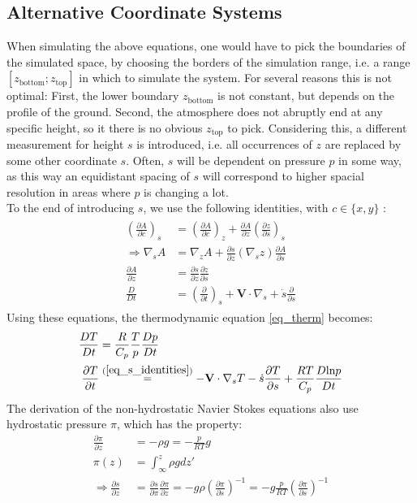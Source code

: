 \subsection{Alternative Coordinate Systems}
When simulating the above equations, one would have to pick the boundaries of the simulated space, by choosing the borders of the simulation range, i.e. a range $[z_{\text{bottom}};z_{\text{top}}]$ in which to simulate the system.
For several reasons this is not optimal:
First, the lower boundary $z_{\text{bottom}}$ is not constant, but depends on the profile of the ground.
Second, the atmosphere does not abruptly end at any specific height, so it there is no obvious $z_{\text{top}}$ to pick.
Considering this, a different measurement for height $s$ is introduced, i.e. all occurrences of $z$ are replaced by some other coordinate $s$.
Often, $s$ will be dependent on pressure $p$ in some way, as this way an equidistant spacing of $s$ will correspond to higher spacial resolution in areas where $p$ is changing a lot.\\
To the end of introducing $s$, we use the following identities, with $c\in\{x,y\}$ \cite{kasahara1974various}:
\begin{align}
\begin{split}
(\frac{\partial A}{\partial c})_s &= (\frac{\partial A}{\partial c})_z + \frac{\partial A}{\partial z}(\frac{\partial z}{\partial s})_s\\
\Rightarrow \nabla _s A &= \nabla _z A+\frac{\partial s}{\partial z}(\nabla _sz)\frac{\partial A}{\partial s}\\
\frac{\partial A}{\partial z} &= \frac{\partial s}{\partial z} \frac{\partial z}{\partial s}\\
\frac{D}{Dt} &= (\frac{\partial}{\partial t})_s + \textbf{V} \cdot \nabla _s + \dot{s}\frac{\partial }{\partial s}
\end{split}\label{eq_s_identities}
\end{align}
Using these equations, the thermodynamic equation \ref{eq_therm} becomes:
\begin{align*}
\frac{DT}{Dt} &= \frac{R}{C_p}\frac{T}{p}\frac{Dp}{Dt}\\
\frac{\partial T}{\partial t} &\stackrel{(\ref{eq_s_identities})}{=} -\textbf{V} \cdot \nabla _s T - \dot{s} \frac{\partial T}{\partial s}+\frac{RT}{C_p}\frac{D\text{ln}p}{Dt}
\end{align*}
The derivation of the non-hydrostatic Navier Stokes equations also use hydrostatic pressure $\pi$, which has the property:
\begin{align}
\frac{\partial \pi}{\partial z} &= -\rho g = - \frac{p}{RT}g \nonumber \\
\pi(z) &= \int_\infty ^z \rho g dz' \nonumber \\
\Rightarrow \frac{\partial s}{\partial z} &= \frac{\partial s}{\partial \pi}\frac{\partial \pi}{\partial z} = - g\rho(\frac{\partial \pi}{\partial s})^{-1} = - g\frac{p}{RT}(\frac{\partial \pi}{\partial s})^{-1} \label{eq_ds_dz}
\end{align}

